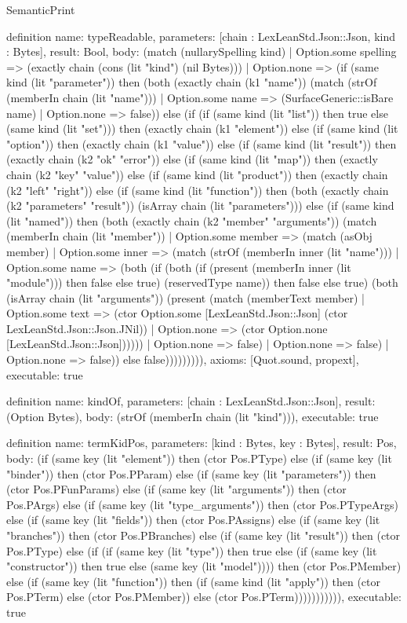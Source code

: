 \begin{lexlean}{SemanticPrint}
\begin{semanticmodule}
definition{
  name: typeReadable,
  parameters: [chain : LexLeanStd.Json::Json, kind : Bytes],
  result: Bool,
  body: (match (nullarySpelling kind)
    | Option.some spelling => (exactly chain (cons (lit "kind") (nil Bytes)))
    | Option.none => (if (same kind (lit "parameter")) then (both (exactly chain (k1 "name")) (match (strOf (memberIn chain (lit "name")))
      | Option.some name => (SurfaceGeneric::isBare name)
      | Option.none => false)) else (if (if (same kind (lit "list")) then true else (same kind (lit "set"))) then (exactly chain (k1 "element")) else (if (same kind (lit "option")) then (exactly chain (k1 "value")) else (if (same kind (lit "result")) then (exactly chain (k2 "ok" "error")) else (if (same kind (lit "map")) then (exactly chain (k2 "key" "value")) else (if (same kind (lit "product")) then (exactly chain (k2 "left" "right")) else (if (same kind (lit "function")) then (both (exactly chain (k2 "parameters" "result")) (isArray chain (lit "parameters"))) else (if (same kind (lit "named")) then (both (exactly chain (k2 "member" "arguments")) (match (memberIn chain (lit "member"))
      | Option.some member => (match (asObj member)
        | Option.some inner => (match (strOf (memberIn inner (lit "name")))
          | Option.some name => (both (if (both (if (present (memberIn inner (lit "module"))) then false else true) (reservedType name)) then false else true) (both (isArray chain (lit "arguments")) (present (match (memberText member)
            | Option.some text => (ctor Option.some [LexLeanStd.Json::Json] (ctor LexLeanStd.Json::Json.JNil))
            | Option.none => (ctor Option.none [LexLeanStd.Json::Json])))))
          | Option.none => false)
        | Option.none => false)
      | Option.none => false)) else false))))))))),
  axioms: [Quot.sound, propext],
  executable: true
}

definition{
  name: kindOf,
  parameters: [chain : LexLeanStd.Json::Json],
  result: (Option Bytes),
  body: (strOf (memberIn chain (lit "kind"))),
  executable: true
}

definition{
  name: termKidPos,
  parameters: [kind : Bytes, key : Bytes],
  result: Pos,
  body: (if (same key (lit "element")) then (ctor Pos.PType) else (if (same key (lit "binder")) then (ctor Pos.PParam) else (if (same key (lit "parameters")) then (ctor Pos.PFunParams) else (if (same key (lit "arguments")) then (ctor Pos.PArgs) else (if (same key (lit "type_arguments")) then (ctor Pos.PTypeArgs) else (if (same key (lit "fields")) then (ctor Pos.PAssigns) else (if (same key (lit "branches")) then (ctor Pos.PBranches) else (if (same key (lit "result")) then (ctor Pos.PType) else (if (if (same key (lit "type")) then true else (if (same key (lit "constructor")) then true else (same key (lit "model")))) then (ctor Pos.PMember) else (if (same key (lit "function")) then (if (same kind (lit "apply")) then (ctor Pos.PTerm) else (ctor Pos.PMember)) else (ctor Pos.PTerm))))))))))),
  executable: true
}


\end{semanticmodule}
\end{lexlean}
